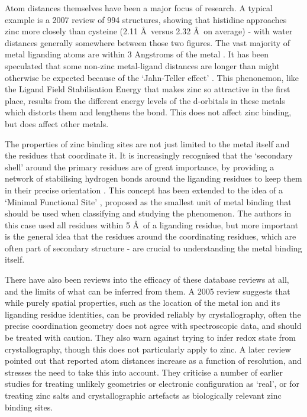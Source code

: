 Atom distances themselves have been a major focus of research. A typical example is a 2007 review \cite{tamames2007analysis} of 994 structures, showing that histidine approaches zinc more closely than cysteine (2.11 \AA \ versus 2.32 \AA \ on average) - with water distances generally somewhere between those two figures. The vast majority of metal liganding atoms are within 3 Angstroms of the metal \cite{dokmanic2008metals}. It has been speculated that some non-zinc metal-ligand distances are longer than might otherwise be expected because of the `Jahn-Teller effect' \cite{doi:10.1002/prot.21601}. This phenonemon, like the Ligand Field Stabilisation Energy that makes zinc so attractive in the first place, results from the different energy levels of the d-orbitals in these metals which distorts them and lengthens the bond. This does not affect zinc binding, but does affect other metals.

The properties of zinc binding sites are not just limited to the metal itself and the residues that coordinate it. It is increasingly recognised that the `secondary shell' around the primary residues are of great importance, by providing a network of stabilising hydrogen bonds around the liganding residues to keep them in their precise orientation \cite{auld2001zinc}. This concept has been extended to the idea of a `Minimal Functional Site' \cite{andreini2011minimal}, proposed as the smallest unit of metal binding that should be used when classifying and studying the phenomenon. The authors in this case used all residues within 5 \AA \ of a liganding residue, but more important is the general idea that the residues around the coordinating residues, which are often part of secondary structure - are crucial to understanding the metal binding itself.

There have also been reviews into the efficacy of these database reviews at all, and the limits of what can be inferred from them. A 2005 review \cite{sommerhalter2005x} suggests that while purely spatial properties, such as the location of the metal ion and its liganding residue identities, can be provided reliably by crystallography, often the precise coordination geometry does not agree with spectroscopic data, and should be treated with caution. They also warn against trying to infer redox state from crystallography, though this does not particularly apply to zinc. A later review \cite{laitaoja2013zinc} pointed out that reported atom distances increase as a function of resolution, and stresses the need to take this into account. They criticise a number of earlier studies for treating unlikely geometries or electronic configuration as `real', or for treating zinc salts and crystallographic artefacts as biologically relevant zinc binding sites.

